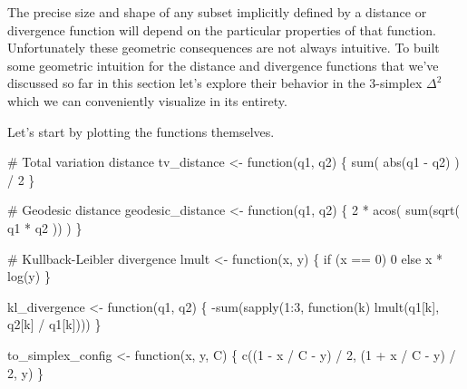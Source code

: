 \documentclass[
  letterpaper,
  DIV=11,
  numbers=noendperiod]{scrartcl}
\newenvironment{Shaded}{\begin{snugshade}}{\end{snugshade}}
\newcommand{\CommentTok}[1]{\textcolor[rgb]{0.37,0.37,0.37}{#1}}
\newcommand{\ControlFlowTok}[1]{\textcolor[rgb]{0.00,0.23,0.31}{#1}}
\newcommand{\DecValTok}[1]{\textcolor[rgb]{0.68,0.00,0.00}{#1}}
\newcommand{\FunctionTok}[1]{\textcolor[rgb]{0.28,0.35,0.67}{#1}}
\newcommand{\NormalTok}[1]{\textcolor[rgb]{0.00,0.23,0.31}{#1}}
\newcommand{\OtherTok}[1]{\textcolor[rgb]{0.00,0.23,0.31}{#1}}
\newcommand{\SpecialCharTok}[1]{\textcolor[rgb]{0.37,0.37,0.37}{#1}}
\begin{document}
The precise size and shape of any subset implicitly defined by a
distance or divergence function will depend on the particular properties
of that function. Unfortunately these geometric consequences are not
always intuitive. To built some geometric intuition for the distance and
divergence functions that we've discussed so far in this section let's
explore their behavior in the \(3\)-simplex \(\Delta^{2}\) which we can
conveniently visualize in its entirety.

Let's start by plotting the functions themselves.

\begin{Shaded}
\begin{Highlighting}[]
\CommentTok{\# Total variation distance}
\NormalTok{tv\_distance }\OtherTok{\textless{}{-}} \ControlFlowTok{function}\NormalTok{(q1, q2) \{}
  \FunctionTok{sum}\NormalTok{( }\FunctionTok{abs}\NormalTok{(q1 }\SpecialCharTok{{-}}\NormalTok{ q2) ) }\SpecialCharTok{/} \DecValTok{2}
\NormalTok{\}}

\CommentTok{\# Geodesic distance}
\NormalTok{geodesic\_distance }\OtherTok{\textless{}{-}} \ControlFlowTok{function}\NormalTok{(q1, q2) \{}
  \DecValTok{2} \SpecialCharTok{*} \FunctionTok{acos}\NormalTok{( }\FunctionTok{sum}\NormalTok{(}\FunctionTok{sqrt}\NormalTok{( q1 }\SpecialCharTok{*}\NormalTok{ q2 )) )}
\NormalTok{\}}

\CommentTok{\# Kullback{-}Leibler divergence}
\NormalTok{lmult }\OtherTok{\textless{}{-}} \ControlFlowTok{function}\NormalTok{(x, y) \{}
  \ControlFlowTok{if}\NormalTok{ (x }\SpecialCharTok{==} \DecValTok{0}\NormalTok{) }\DecValTok{0} \ControlFlowTok{else}\NormalTok{ x }\SpecialCharTok{*} \FunctionTok{log}\NormalTok{(y)}
\NormalTok{\}}

\NormalTok{kl\_divergence }\OtherTok{\textless{}{-}} \ControlFlowTok{function}\NormalTok{(q1, q2) \{}
  \SpecialCharTok{{-}}\FunctionTok{sum}\NormalTok{(}\FunctionTok{sapply}\NormalTok{(}\DecValTok{1}\SpecialCharTok{:}\DecValTok{3}\NormalTok{, }\ControlFlowTok{function}\NormalTok{(k) }\FunctionTok{lmult}\NormalTok{(q1[k], q2[k] }\SpecialCharTok{/}\NormalTok{ q1[k])))}
\NormalTok{\}}
\end{Highlighting}
\end{Shaded}

\begin{Shaded}
\begin{Highlighting}[]
\NormalTok{to\_simplex\_config }\OtherTok{\textless{}{-}} \ControlFlowTok{function}\NormalTok{(x, y, C) \{}
  \FunctionTok{c}\NormalTok{((}\DecValTok{1} \SpecialCharTok{{-}}\NormalTok{ x }\SpecialCharTok{/}\NormalTok{ C }\SpecialCharTok{{-}}\NormalTok{ y) }\SpecialCharTok{/} \DecValTok{2}\NormalTok{, (}\DecValTok{1} \SpecialCharTok{+}\NormalTok{ x }\SpecialCharTok{/}\NormalTok{ C }\SpecialCharTok{{-}}\NormalTok{ y) }\SpecialCharTok{/} \DecValTok{2}\NormalTok{, y)}
\NormalTok{\}}
\end{Highlighting}
\end{Shaded}
\end{document}
